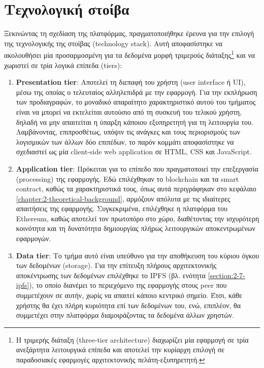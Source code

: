 \section{Τεχνολογική στοίβα} \label{section:3-2-technology-stack}

Ξεκινώντας τη σχεδίαση της πλατφόρμας, πραγματοποιήθηκε έρευνα για την επιλογή της τεχνολογικής της στοίβας (technology stack). Αυτή αποφασίστηκε να ακολουθήσει μία προσαρμοσμένη για τα δεδομένα μορφή τριμερούς διάταξης\footnote{Η τριμερής διάταξη (three-tier architecture) διαχωρίζει μία εφαρμογή σε τρία ανεξάρτητα λειτουργικά επίπεδα και αποτελεί την κυρίαρχη επιλογή σε παραδοσιακές εφαρμογές αρχιτεκτονικής πελάτη-εξυπηρετητή.} και να χωριστεί σε τρία λογικά επίπεδα (tiers):

\begin{enumerate}
    \item \textbf{Presentation tier}: Αποτελεί τη διεπαφή του χρήστη (user interface ή UI), μέσω της οποίας ο τελευταίος αλληλεπιδρά με την εφαρμογή. Για την εκπλήρωση των προδιαγραφών, το μοναδικό απαραίτητο χαρακτηριστικό αυτού του τμήματος είναι να μπορεί να εκτελείται αυτούσιο από τη συσκευή του τελικού χρήστη, δηλαδή να μην απαιτείται η ύπαρξη κάποιου εξυπηρετητή για τη λειτουργία του. Λαμβάνοντας, επιπροσθέτως, υπόψιν τις ανάγκες και τους περιορισμούς των λογισμικών των άλλων δύο επιπέδων, το παρόν κομμάτι αποφασίστηκε να σχεδιαστεί ως μία client-side web application σε HTML, CSS και JavaScript.

    \item \textbf{Application tier}: Πρόκειται για το επίπεδο που πραγματοποιεί την επεξεργασία (\textenglish{processing}) της εφαρμογής. Εδώ επιλέχθηκαν το blockchain και τα smart contract, καθώς τα χαρακτηριστικά τους, όπως αυτά περιγράφηκαν στο κεφάλαιο \ref{chapter:2-theoretical-background}, αρμόζουν απόλυτα με τις ιδιαίτερες απαιτήσεις της εφαρμογής. Συγκεκριμένα, επιλέχθηκε η πλατφόρμα του Ethereum, καθώς αποτελεί τον πρωτοπόρο στο χώρο, διαθέτοντας την ισχυρότερη κοινότητα και τη δυνατότητα δημιουργίας πλήρως λειτουργικών αποκεντρωμένων εφαρμογών.

    \item \textbf{Data tier}: Το τμήμα αυτό είναι υπεύθυνο για την αποθήκευση του κύριου όγκου των δεδομένων (storage). Για την επίτευξη πλήρους αρχιτεκτονικής αποκέντρωσης των δεδομένων επιλέχθηκε το IPFS (βλ. ενότητα \ref{section:2-7-ipfs}), το οποίο διανέμει το περιεχόμενο της εφαρμογής στους peer που συμμετέχουν σε αυτήν, χωρίς να απαιτεί κάποιο κεντρικό σημείο. Έτσι, κάθε χρήστης θα έχει πλήρη κυριότητα επί των δεδομένων του, ενώ, επιπλέον, θα συμμετέχει στην πλατφόρμα διαμοιράζοντας τα δεδομένα άλλων χρηστών.
\end{enumerate}

